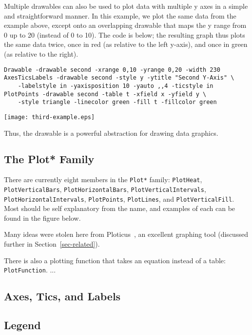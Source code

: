 Multiple drawables can also be used to plot data with multiple y axes in a
simple and straightforward manner. In this example, we plot the same data from
the example above, except onto an overlapping drawable that maps the y range
from 0 up to 20 (instead of 0 to 10). The code is below; the resulting graph
thus plots the same data twice, once in red (as relative to the left y-axis),
and once in green (as relative to the right).

\begin{verbatim}
Drawable -drawable second -xrange 0,10 -yrange 0,20 -width 230
AxesTicsLabels -drawable second -style y -ytitle "Second Y-Axis" \
    -labelstyle in -yaxisposition 10 -yauto ,,4 -ticstyle in
PlotPoints -drawable second -table t -xfield x -yfield y \
    -style triangle -linecolor green -fill t -fillcolor green
\end{verbatim}

\texttt{[image: third-example.eps]}

Thus, the drawable is a powerful abstraction for drawing data graphics. 

\subsection{The Plot* Family}

There are currently eight members in the \texttt{Plot*} family:
\texttt{PlotHeat}, \texttt{PlotVerticalBars}, \texttt{PlotHorizontalBars},
\texttt{PlotVerticalIntervals}, \texttt{PlotHorizontalIntervals},
\texttt{PlotPoints}, \texttt{PlotLines}, and \texttt{PlotVerticalFill}.
Most should be self explanatory from the name, and examples of each can be
found in the figure below.

Many ideas were stolen here from Ploticus~\cite{Ploticus}, an excellent
graphing tool (discussed further in Section~\ref{sec-related}). 



There is also a plotting function that takes an equation instead of a
table: \texttt{PlotFunction}. ...




\subsection{Axes, Tics, and Labels}



\subsection{Legend}



